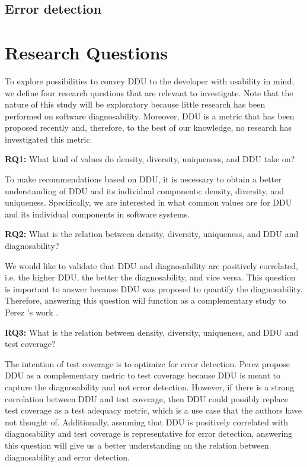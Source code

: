 \documentclass[twoside,a4paper,11pt]{memoir}
\begin{document}
\section{Error detection}


\chapter{Research Questions}
\label{ch:research_questions}
To explore possibilities to convey DDU to the developer with usability in mind, we define four research questions that are relevant to investigate.
Note that the nature of this study will be exploratory because little research has been performed on software diagnosability.
Moreover, DDU is a metric that has been proposed recently \cite{DBLP:conf/icse/PerezAD17} and, therefore, to the best of our knowledge, no research has investigated this metric.

\begin{framed}
\noindent
\textbf{RQ1:} What kind of values do density, diversity, uniqueness, and DDU take on?
\end{framed}

To make recommendations based on DDU, it is necessary to obtain a better understanding of DDU and its individual components: density, diversity, and uniqueness.
Specifically, we are interested in what common values are for DDU and its individual components in software systems.

\begin{framed}
\noindent
\textbf{RQ2:} What is the relation between density, diversity, uniqueness, and DDU and diagnosability?
\end{framed}

We would like to validate that DDU and diagnosability are positively correlated, i.e. the higher DDU, the better the diagnosability, and vice versa.
This question is important to answer because DDU was proposed to quantify the diagnosability.
Therefore, answering this question will function as a complementary study to Perez \etal's work \cite{DBLP:conf/icse/PerezAD17}.

\begin{framed}
\noindent
\textbf{RQ3:} What is the relation between density, diversity, uniqueness, and DDU and test coverage?
\end{framed}

The intention of test coverage is to optimize for error detection.
Perez \etal propose DDU as a complementary metric to test coverage \cite{DBLP:conf/icse/PerezAD17} because DDU is meant to capture the diagnosability and not error detection.
However, if there is a strong correlation between DDU and test coverage, then DDU could possibly replace test coverage as a test adequacy metric, which is a use case that the authors have not thought of.
Additionally, assuming that DDU is positively correlated with diagnosability and test coverage is representative for error detection, answering this question will give us a better understanding on the relation between diagnosability and error detection.
\end{document}
